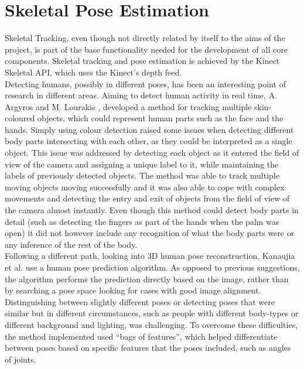 \section{Skeletal Pose Estimation}

Skeletal Tracking, even though not directly related by itself to the aims of the project, is part of the base functionality needed for the development of all core components. Skeletal tracking and pose estimation is achieved by the Kinect Skeletal API, which uses the Kinect's depth feed.\\

Detecting humans, possibly in different poses, has been an interesting point of research in different areas. Aiming to detect human activity in real time, A. Argyros and M. Lourakis \cite{Argyros2004}, developed a method for tracking multiple skin-coloured objects, which could represent human parts such as the face and the hands. Simply using colour detection raised some issues when detecting different body parts intersecting with each other, as they could be interpreted as a single object. This issue was addressed by detecting each object as it entered the field of view of the camera and assigning a unique label to it, while maintaining the labels of previously detected objects. The method was able to track multiple moving objects moving successfully and it was also able to cope with complex movements and detecting the entry and exit of objects from the field of view of the camera almost instantly. Even though this method could detect body parts in detail (such as detecting the fingers as part of the hands when the palm was open) it did not however include any recognition of what the body parts were or any inference of the rest of the body.\\

Following a different path, looking into 3D human pose reconstruction, Kanaujia et al. \cite{Kanaujia2007} use a human pose prediction algorithm. As opposed to previous suggestions, the algorithm performs the prediction directly based on the image, rather than by searching a pose space looking for cases with good image alignment. Distinguishing between slightly different poses or detecting poses that were similar but in different circumstances, such as people with different body-types or different background and lighting, was challenging. To overcome these difficulties, the method implemented used “bags of features”, which helped differentiate between poses based on specific features that the poses included, such as angles of joints.\\

